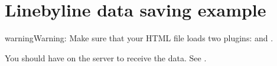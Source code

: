 \documentclass[letterpaper,10pt,english]{sphinxmanual}
\begin{document}
\begin{sphinxVerbatim}[commandchars=\\\{\}]
     \PYG{p}{[}\PYG{p}{]}
      
           
         
\end{sphinxVerbatim}


\chapter{Line\sphinxhyphen{}by\sphinxhyphen{}line data saving example}
\label{\detokenize{linebyline:line-by-line-data-saving-example}}\label{\detokenize{linebyline:linebyline}}\label{\detokenize{linebyline::doc}}
\begin{sphinxadmonition}{warning}{Warning:}
Make sure that your HTML file loads two plugins:
 and .
\end{sphinxadmonition}

You should have  on the server to receive the data. See {\hyperref[\detokenize{record_result::doc}]{}}.
\end{document}
